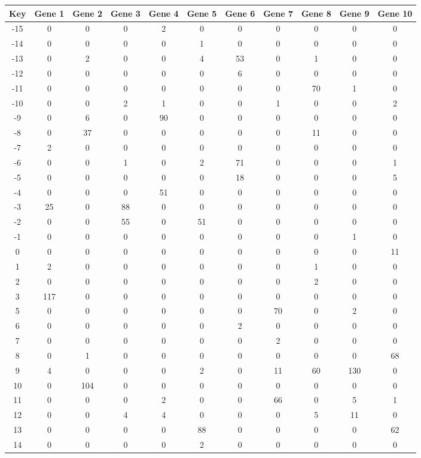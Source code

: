 \begin{tabular}{|c|c|c|c|c|c|c|c|c|c|c|}
\hline
Key & Gene 1 & Gene 2 & Gene 3 & Gene 4 & Gene 5 & Gene 6 & Gene 7 & Gene 8 & Gene 9 & Gene 10 \\
\hline
-15 & 0 & 0 & 0 & 2 & 0 & 0 & 0 & 0 & 0 & 0 \\
-14 & 0 & 0 & 0 & 0 & 1 & 0 & 0 & 0 & 0 & 0 \\
-13 & 0 & 2 & 0 & 0 & 4 & 53 & 0 & 1 & 0 & 0 \\
-12 & 0 & 0 & 0 & 0 & 0 & 6 & 0 & 0 & 0 & 0 \\
-11 & 0 & 0 & 0 & 0 & 0 & 0 & 0 & 70 & 1 & 0 \\
-10 & 0 & 0 & 2 & 1 & 0 & 0 & 1 & 0 & 0 & 2 \\
-9 & 0 & 6 & 0 & 90 & 0 & 0 & 0 & 0 & 0 & 0 \\
-8 & 0 & 37 & 0 & 0 & 0 & 0 & 0 & 11 & 0 & 0 \\
-7 & 2 & 0 & 0 & 0 & 0 & 0 & 0 & 0 & 0 & 0 \\
-6 & 0 & 0 & 1 & 0 & 2 & 71 & 0 & 0 & 0 & 1 \\
-5 & 0 & 0 & 0 & 0 & 0 & 18 & 0 & 0 & 0 & 5 \\
-4 & 0 & 0 & 0 & 51 & 0 & 0 & 0 & 0 & 0 & 0 \\
-3 & 25 & 0 & 88 & 0 & 0 & 0 & 0 & 0 & 0 & 0 \\
-2 & 0 & 0 & 55 & 0 & 51 & 0 & 0 & 0 & 0 & 0 \\
-1 & 0 & 0 & 0 & 0 & 0 & 0 & 0 & 0 & 1 & 0 \\
0 & 0 & 0 & 0 & 0 & 0 & 0 & 0 & 0 & 0 & 11 \\
1 & 2 & 0 & 0 & 0 & 0 & 0 & 0 & 1 & 0 & 0 \\
2 & 0 & 0 & 0 & 0 & 0 & 0 & 0 & 2 & 0 & 0 \\
3 & 117 & 0 & 0 & 0 & 0 & 0 & 0 & 0 & 0 & 0 \\
5 & 0 & 0 & 0 & 0 & 0 & 0 & 70 & 0 & 2 & 0 \\
6 & 0 & 0 & 0 & 0 & 0 & 2 & 0 & 0 & 0 & 0 \\
7 & 0 & 0 & 0 & 0 & 0 & 0 & 2 & 0 & 0 & 0 \\
8 & 0 & 1 & 0 & 0 & 0 & 0 & 0 & 0 & 0 & 68 \\
9 & 4 & 0 & 0 & 0 & 2 & 0 & 11 & 60 & 130 & 0 \\
10 & 0 & 104 & 0 & 0 & 0 & 0 & 0 & 0 & 0 & 0 \\
11 & 0 & 0 & 0 & 2 & 0 & 0 & 66 & 0 & 5 & 1 \\
12 & 0 & 0 & 4 & 4 & 0 & 0 & 0 & 5 & 11 & 0 \\
13 & 0 & 0 & 0 & 0 & 88 & 0 & 0 & 0 & 0 & 62 \\
14 & 0 & 0 & 0 & 0 & 2 & 0 & 0 & 0 & 0 & 0 \\
\hline
\end{tabular}